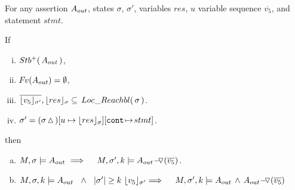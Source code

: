 \begin{lemma}
\label{l:calls:return:ext}

For any  assertion $\Aout$, states $\sigma$, $\sigma'$, variables $res$, $u$ variable sequence   $\overline{v_5}$,  and statement $stmt$.

\noindent
 If 
 
\begin{enumerate}[(i)]
\item 
$ \Pos \Aout$,  
\item 
 $\fv(\Aout) = \emptyset$,
\item
$  \overline {\interpret {\sigma'} {v_5}}, {\interpret {\sigma} {res}} \subseteq \LRelevantO \sigma $.
 \item
$\sigma'= (\sigma \popSymbol)[ u  \mapsto  {\interpret {\sigma} {res}}][\prg{cont}\!\mapsto\! stmt]$.
  \end{enumerate}
 \noindent
then


\begin{enumerate}[a.]
\item
 \label{l:ext:return:one}
 $M, \sigma \models  {\Aout}\  
 \hfill \Longrightarrow  \ \ \  \  \satDAssertFrom M  {\sigma'} k  {\PushASLong  {(\overline {v_5})}    {\Aout}}$.

\item
\label{l:ext:return:two}
$\satDAssertFrom M  \sigma k   \Aout  \ \  \wedge\ \ \DepthSt {\sigma'} \geq k  \ 
{\interpret {\sigma'} {v_5}}
 \hfill \Longrightarrow  \ \ \  \   \satDAssertFrom M  {\sigma'} k   {\Aout \, \wedge\, {\PushASLong  {(\overline {v_5})}    {\Aout}}} $

 
\end{enumerate}

\end{lemma}


